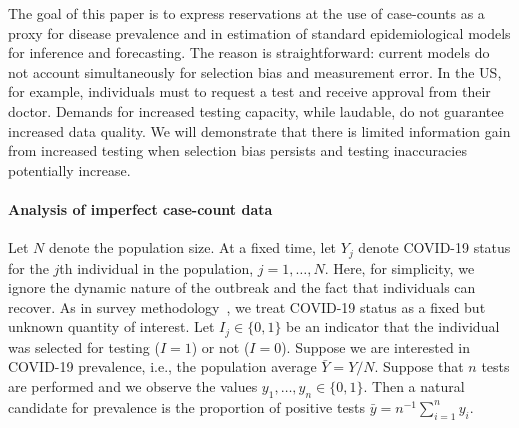 \documentclass[12pt]{article}
\begin{document}
The goal of this paper is to express reservations at the use of case-counts as a proxy for disease prevalence and in estimation of standard epidemiological models for inference and forecasting.  The reason is straightforward: current models do not account simultaneously for selection bias and measurement error. In the US, for example, individuals must to request a test and receive approval from their doctor. Demands for increased testing capacity, while laudable, do not guarantee increased data quality. We will demonstrate that there is limited information gain from increased testing when selection bias persists and testing inaccuracies potentially increase.

\paragraph*{Analysis of imperfect case-count data}

Let $N$ denote the population size.  At a fixed time, let $Y_j$ denote COVID-19 status for the $j$th individual in the population, $j=1,\ldots, N$.
Here, for simplicity, we ignore the dynamic nature of the outbreak and the fact that individuals can recover.  As in survey methodology~\cite{Cochran77}, we treat COVID-19 status as a fixed but unknown quantity of interest. Let $I_j \in \{0,1\}$ be an indicator that the individual was selected for testing ($I = 1$) or not ($I=0$). Suppose we are interested in COVID-19 prevalence, i.e., the population average $\bar Y = Y/N$. Suppose that $n$ tests are performed and we observe the values $y_1, \ldots, y_n \in \{0,1\}$.  Then a natural candidate for prevalence is the proportion of positive tests $\bar y = n^{-1} \sum_{i=1}^n y_i$.
\end{document}

